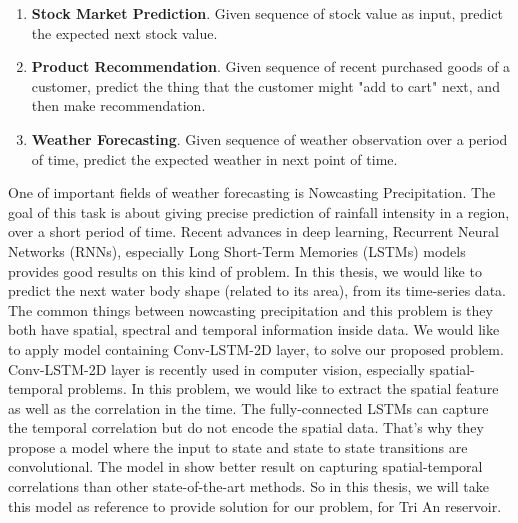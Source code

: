 \begin{enumerate}
	\item \textbf{Stock Market Prediction}\cite{Pagolu2016,Liu2018}. Given sequence of stock value as input, predict the expected next stock value. 
	
	\item \textbf{Product Recommendation}\cite{Wang2018,Cao2019}. Given sequence of recent purchased goods of a customer, predict the thing that the customer might "add to cart" next, and then make recommendation. 
	
	\item \textbf{Weather Forecasting}\cite{Quan2000,Wang2017}. Given sequence of weather observation over a period of time, predict the expected weather in next point of time.
	
\end{enumerate}


One of important fields of weather forecasting is Nowcasting Precipitation\cite{Sun2013}. The goal of this task is about giving precise prediction of rainfall intensity in a region, over a short period of time. Recent advances in deep learning, Recurrent Neural Networks (RNNs), especially Long Short-Term Memories (LSTMs) models\cite{Graves2013GeneratingSW,Hochreiter1997,Cho2014,Donahue2017} provides good results on this kind of problem. In this thesis, we would like to predict the next water body shape (related to its area), from its time-series data. The common things between nowcasting precipitation and this problem is they both have spatial, spectral and temporal information inside data. We would like to apply model containing Conv-LSTM-2D layer\cite{Shi2015ConvolutionalLN}, to solve our proposed problem. Conv-LSTM-2D layer is recently used in computer vision, especially spatial-temporal problems. In this problem, we would like to extract the spatial feature as well as the correlation in the time. The fully-connected LSTMs can capture the temporal correlation but do not encode the spatial data. That's why they propose a model where the input to state and state to state transitions are convolutional. The model in \cite{Shi2015ConvolutionalLN} show better result on capturing spatial-temporal correlations than other state-of-the-art methods. So in this thesis, we will take this model as reference to provide solution for our problem, for Tri An reservoir.

